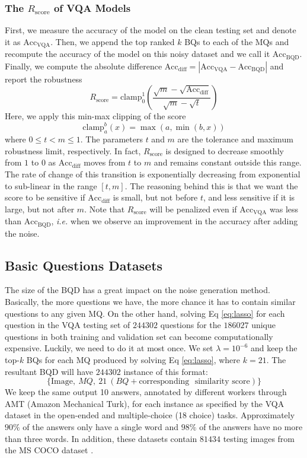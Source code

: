 \documentclass[letterpaper]{article}
\newcommand{\ie}{}\def\ie/{{\em i.e.}}
\newcommand{\rscore}{}\def\rscore/{$R_{\text{score}}$}
\begin{document}
\subsubsection{The \rscore/ of VQA Models}
First, we measure the accuracy of the model on the clean testing set and denote it as $\text{Acc}_\text{VQA}$. Then, we append the top ranked $k$ BQs to each of the MQs and recompute the accuracy of the model on this noisy dataset and we call it $\text{Acc}_\text{BQD}$. Finally, we compute the absolute difference $\text{Acc}_\text{diff} = \left|\text{Acc}_\text{VQA}-\text{Acc}_\text{BQD}\right|$ and report the robustness
\begin{equation}
	R_\text{score} = \text{clamp}_{0}^{1}\left(\frac{\sqrt{m}-\sqrt{{\text{Acc}_\text{diff}}}}{\sqrt{m}-\sqrt{t}}\right)
\end{equation}
Here, we apply this min-max clipping of the score
$$\text{clamp}_{a}^{b}(x) = \max\left(a,{\min\left(b,x\right)}\right)$$
where $0 \leq t < m \leq 1$. The parameters $t$ and $m$ are the tolerance and maximum robustness limit, respectively. In fact, \rscore/ is designed to decrease smoothly from $1$ to $0$ as $\text{Acc}_\text{diff}$ moves from $t$ to $m$ and remains constant outside this range. The rate of change of this transition is exponentially decreasing from exponential to sub-linear in the range $[t, m]$. The reasoning behind this is that we want the score to be sensitive if $\text{Acc}_\text{diff}$ is small, but not before $t$, and less sensitive if it is large, but not after $m$. Note that \rscore/ will be penalized even if $\text{Acc}_\text{VQA}$ was less than $\text{Acc}_\text{BQD}$, \ie/  when we observe an improvement in the accuracy after adding the noise.

\subsection{Basic Questions Datasets}
The size of the BQD has a great impact on the noise generation method. Basically, the more questions we have, the more chance it has to contain similar questions to any given MQ. On the other hand, solving Eq \ref{eq:lasso} for each question in the VQA testing set of $244302$ questions for the $186027$ unique questions in both training and validation set can become computationally expensive. Luckily, we need to do it at most once. We set $\lambda = {10}^{-6}$ and keep the top-$k$ BQs for each MQ produced by solving Eq \ref{eq:lasso}, where $k = 21$. The resultant BQD will have $244302$ instance of this format:
$$\{\text{Image},~MQ,~21~(BQ + \text{corresponding~ similarity~score})\}$$
We keep the same output 10 answers, annotated by different workers through AMT (Amazon Mechanical Turk), for each instance as specified by the VQA dataset \cite{4} in the open-ended and multiple-choice (18 choice) tasks. Approximately $90\%$ of the answers only have a single word and $98\%$ of the answers have no more than three words. In addition, these datasets contain $81434$ testing images from the MS COCO dataset \cite{51}.
\end{document}
